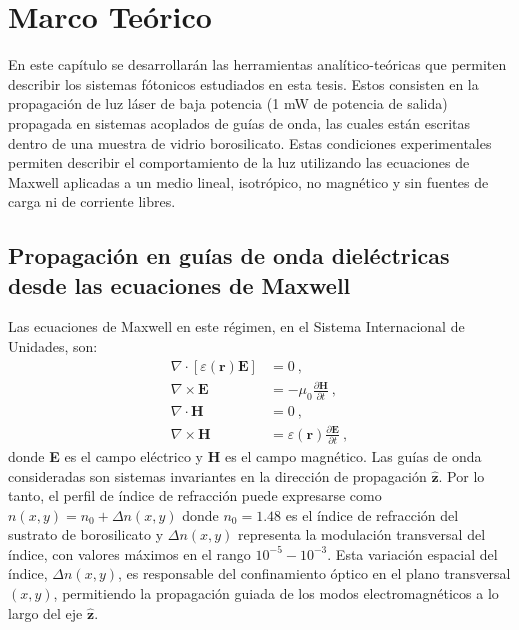 \chapter{Marco Teórico \label{cap:teo}}

En este capítulo se desarrollarán las herramientas analítico-teóricas que permiten describir los sistemas fótonicos estudiados en esta tesis. Estos consisten en la propagación de luz láser de baja potencia (1 mW de potencia de salida) propagada en sistemas acoplados de guías de onda, las cuales están escritas dentro de una muestra de vidrio borosilicato. Estas condiciones experimentales permiten describir el comportamiento de la luz utilizando las ecuaciones de Maxwell aplicadas a un medio lineal, isotrópico, no magnético y sin fuentes de carga ni de corriente libres. 
\section{Propagación en guías de onda dieléctricas desde las ecuaciones de Maxwell \label{cap:maxwell}}

Las ecuaciones de Maxwell en este régimen, en el Sistema Internacional de Unidades, son:
\begin{align}
	\nabla\cdot\left[\varepsilon(\textbf{r})\textbf{E}\right] &= 0 \ , \label{eqn:gauss}
	\\	
	\nabla\times\textbf{E} &= -\mu_0 \frac{\partial \textbf{H}}{\partial t} \ , \label{eqn:faraday-lenz}
	\\	
	\nabla\cdot\textbf{H} &= 0 \ , \label{eqn:div0}
	\\	
	\nabla\times\textbf{H} &=\varepsilon(\textbf{r}) \frac{\partial \textbf{E}}{\partial t} \ , \label{eqn:ampere-maxwell}
\end{align}
donde \textbf{E} es el campo eléctrico y \textbf{H} es el campo magnético. Las guías de onda consideradas son sistemas invariantes en la dirección de propagación $\hat{\textbf{z}}$. Por lo tanto, el perfil de índice de refracción puede expresarse como $n(x,y) = n_0 + \Delta n(x,y)$ donde $n_0 = 1.48$ es el índice de refracción del sustrato de borosilicato y $\Delta n(x,y)$ representa la modulación transversal del índice, con valores máximos en el rango $10^{-5} - 10^{-3}$. Esta variación espacial del índice, $\Delta n(x,y)$, es responsable del confinamiento óptico en el plano transversal $(x,y)$, permitiendo la propagación guiada de los modos electromagnéticos a lo largo del eje $\hat{\textbf{z}}$. 

